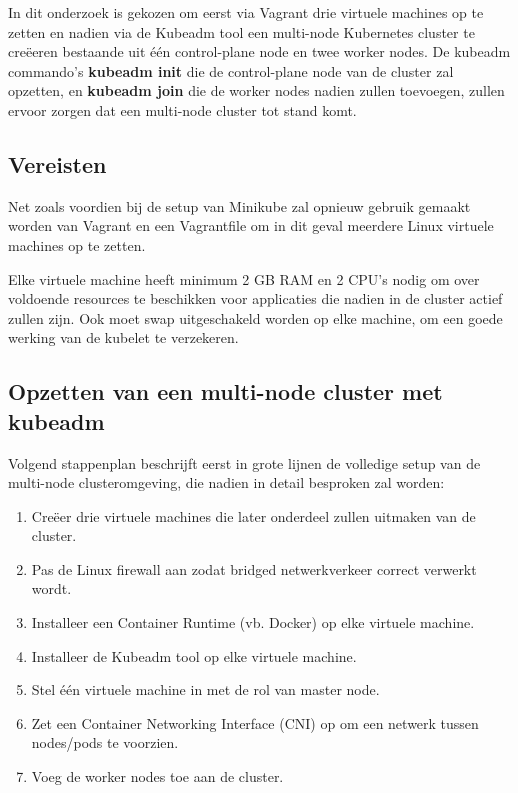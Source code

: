 In dit onderzoek is gekozen om eerst via Vagrant drie virtuele machines op te zetten  en nadien via de Kubeadm tool een multi-node Kubernetes cluster te creëeren bestaande uit één control-plane node en twee worker nodes. De kubeadm commando's {\bf kubeadm init} die de control-plane node van de cluster zal opzetten, en {\bf kubeadm join} die de worker nodes nadien zullen toevoegen, zullen ervoor zorgen dat een multi-node cluster tot stand komt.

\subsection{Vereisten}

Net zoals voordien bij de setup van Minikube zal opnieuw gebruik gemaakt worden van Vagrant en een Vagrantfile om in dit geval meerdere Linux virtuele machines op te zetten.

Elke virtuele machine heeft minimum 2 GB RAM en 2 CPU's nodig om over voldoende resources te beschikken voor applicaties die nadien in de cluster actief zullen zijn. Ook moet swap uitgeschakeld worden op elke machine, om een goede werking van de kubelet te verzekeren. \autocite{Kubernetes2022a}

\subsection{Opzetten van een multi-node cluster met kubeadm}

Volgend stappenplan beschrijft eerst in grote lijnen de volledige setup van de multi-node clusteromgeving, die nadien in detail besproken zal worden: 
\begin{enumerate}
    \item Creëer drie virtuele machines die later onderdeel zullen uitmaken van de cluster.
    \item Pas de Linux firewall aan zodat bridged netwerkverkeer correct verwerkt wordt.
    \item Installeer een Container Runtime (vb. Docker) op elke virtuele machine.   
    \item Installeer de Kubeadm tool op elke virtuele machine.
    \item Stel één virtuele machine in met de rol van master node.
    \item Zet een Container Networking Interface (CNI) op om een netwerk tussen nodes/pods te voorzien.
    \item Voeg de worker nodes toe aan de cluster.
\end{enumerate}

